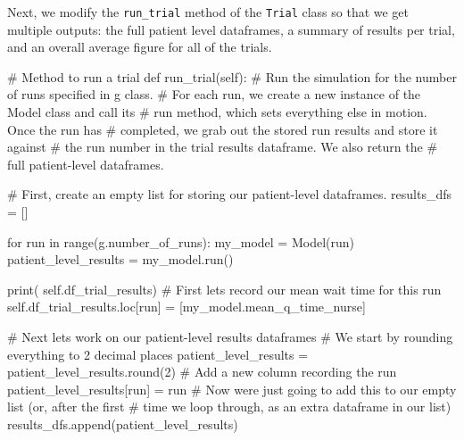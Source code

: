 \documentclass[
  letterpaper,
  DIV=11,
  numbers=noendperiod]{scrreprt}
\newenvironment{Shaded}{\begin{snugshade}}{\end{snugshade}}
\newcommand{\BuiltInTok}[1]{\textcolor[rgb]{0.00,0.23,0.31}{#1}}
\newcommand{\CommentTok}[1]{\textcolor[rgb]{0.37,0.37,0.37}{#1}}
\newcommand{\ControlFlowTok}[1]{\textcolor[rgb]{0.00,0.23,0.31}{#1}}
\newcommand{\DecValTok}[1]{\textcolor[rgb]{0.68,0.00,0.00}{#1}}
\newcommand{\KeywordTok}[1]{\textcolor[rgb]{0.00,0.23,0.31}{#1}}
\newcommand{\NormalTok}[1]{\textcolor[rgb]{0.00,0.23,0.31}{#1}}
\newcommand{\OperatorTok}[1]{\textcolor[rgb]{0.37,0.37,0.37}{#1}}
\newcommand{\StringTok}[1]{\textcolor[rgb]{0.13,0.47,0.30}{#1}}
\newcommand{\VariableTok}[1]{\textcolor[rgb]{0.07,0.07,0.07}{#1}}
\begin{document}
Next, we modify the \texttt{run\_trial} method of the \texttt{Trial}
class so that we get multiple outputs: the full patient level
dataframes, a summary of results per trial, and an overall average
figure for all of the trials.

\label{edited_results_method}
\begin{Shaded}
\begin{Highlighting}[]
\CommentTok{\# Method to run a trial}
\KeywordTok{def}\NormalTok{ run\_trial(}\VariableTok{self}\NormalTok{):}
    \CommentTok{\# Run the simulation for the number of runs specified in g class.}
    \CommentTok{\# For each run, we create a new instance of the Model class and call its}
    \CommentTok{\# run method, which sets everything else in motion.  Once the run has}
    \CommentTok{\# completed, we grab out the stored run results and store it against}
    \CommentTok{\# the run number in the trial results dataframe. We also return the}
    \CommentTok{\# full patient{-}level dataframes.}

    \CommentTok{\# First, create an empty list for storing our patient{-}level dataframes.}
\NormalTok{    results\_dfs }\OperatorTok{=}\NormalTok{ []}

    \ControlFlowTok{for}\NormalTok{ run }\KeywordTok{in} \BuiltInTok{range}\NormalTok{(g.number\_of\_runs):}
\NormalTok{        my\_model }\OperatorTok{=}\NormalTok{ Model(run)}
\NormalTok{        patient\_level\_results }\OperatorTok{=}\NormalTok{ my\_model.run()}

        \BuiltInTok{print}\NormalTok{( }\VariableTok{self}\NormalTok{.df\_trial\_results)}
        \CommentTok{\# First let\textquotesingle{}s record our mean wait time for this run}
        \VariableTok{self}\NormalTok{.df\_trial\_results.loc[run] }\OperatorTok{=}\NormalTok{ [my\_model.mean\_q\_time\_nurse]}

        \CommentTok{\# Next let\textquotesingle{}s work on our patient{-}level results dataframes}
        \CommentTok{\# We start by rounding everything to 2 decimal places}
\NormalTok{        patient\_level\_results }\OperatorTok{=}\NormalTok{ patient\_level\_results.}\BuiltInTok{round}\NormalTok{(}\DecValTok{2}\NormalTok{)}
        \CommentTok{\# Add a new column recording the run}
\NormalTok{        patient\_level\_results[}\StringTok{\textquotesingle{}run\textquotesingle{}}\NormalTok{] }\OperatorTok{=}\NormalTok{ run}
        \CommentTok{\# Now we\textquotesingle{}re just going to add this to our empty list (or, after the first}
        \CommentTok{\# time we loop through, as an extra dataframe in our list)}
\NormalTok{        results\_dfs.append(patient\_level\_results)}


\end{Highlighting}
\end{Shaded}
\end{document}
